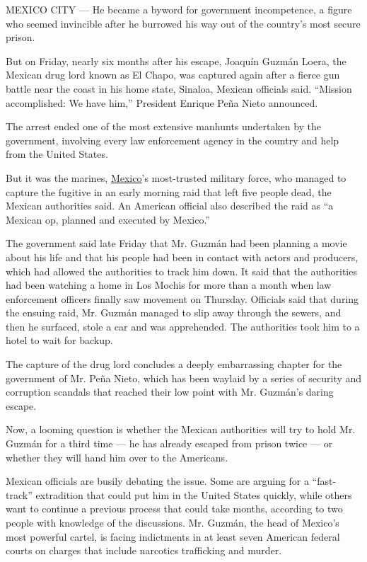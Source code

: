 MEXICO CITY --- He became a byword for government incompetence, a figure
who seemed invincible after he burrowed his way out of the country's
most secure prison.

But on Friday, nearly six months after his escape, Joaquín Guzmán Loera,
the Mexican drug lord known as El Chapo, was captured again after a
fierce gun battle near the coast in his home state, Sinaloa, Mexican
officials said. ``Mission accomplished: We have him,'' President Enrique
Peña Nieto announced.

The arrest ended one of the most extensive manhunts undertaken by the
government, involving every law enforcement agency in the country and
help from the United States.

But it was the marines,
\href{http://topics.nytimes.com/top/news/international/countriesandterritories/mexico/index.html?inline=nyt-geo}{Mexico}'s
most-trusted military force, who managed to capture the fugitive in an
early morning raid that left five people dead, the Mexican authorities
said. An American official also described the raid as ``a Mexican op,
planned and executed by Mexico.''

The government said late Friday that Mr. Guzmán had been planning a
movie about his life and that his people had been in contact with actors
and producers, which had allowed the authorities to track him down. It
said that the authorities had been watching a home in Los Mochis for
more than a month when law enforcement officers finally saw movement on
Thursday. Officials said that during the ensuing raid, Mr. Guzmán
managed to slip away through the sewers, and then he surfaced, stole a
car and was apprehended. The authorities took him to a hotel to wait for
backup.

The capture of the drug lord concludes a deeply embarrassing chapter for
the government of Mr. Peña Nieto, which has been waylaid by a series of
security and corruption scandals that reached their low point with Mr.
Guzmán's daring escape.

Now, a looming question is whether the Mexican authorities will try to
hold Mr. Guzmán for a third time --- he has already escaped from prison
twice --- or whether they will hand him over to the Americans.

Mexican officials are busily debating the issue. Some are arguing for a
``fast-track'' extradition that could put him in the United States
quickly, while others want to continue a previous process that could
take months, according to two people with knowledge of the discussions.
Mr. Guzmán, the head of Mexico's most powerful cartel, is facing
indictments in at least seven American federal courts on charges that
include narcotics trafficking and murder.

